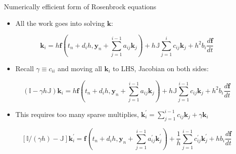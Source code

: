 \documentclass[serif]{beamer}
\begin{document}
\begin{frame}{Numerically efficient form of Rosenbrock equations}
  \begin{itemize}
    \item All the work goes into solving $\mathbf{k}$:
  \end{itemize}
  \begin{equation}
    \nonumber 
    \mathbf{k}_{i} = h\mathbf{f} \left(t_n + d_ih,\mathbf{y}_n + \sum_{j=1}^{i-1}a_{ij}\mathbf{k}_{j}\right) 
                   + h\mathbb{J}\sum_{j=1}^i c_{ij}\mathbf{k}_{j}  + h^2b_i\frac{d\mathbf{f}}{dt}
  \end{equation}
  \begin{itemize}
    \item Recall $\gamma\equiv c_{ii}$ and moving all $\mathbf{k}_i$ to LHS, \alert{Jacobian on both sides}:
  \end{itemize}
    \begin{equation}
    \nonumber 
    \left(\mathbb{I} - \gamma h \mathbb{J}\right)\mathbf{k}_{i} = h\mathbf{f} \left(t_n + d_ih,\mathbf{y}_n + \sum_{j=1}^{i-1}a_{ij}\mathbf{k}_{j}\right) 
                   + h\mathbb{J}\sum_{j=1}^{i-1} c_{ij}\mathbf{k}_{j}  + h^2b_i\frac{d\mathbf{f}}{dt}
  \end{equation}
  \begin{itemize}
    \item This requires too many sparse multiplies, $\mathbf{k}^\prime_i=\sum_{j=1}^{i-1}c_{ij}\mathbf{k}_j + \gamma\mathbf{k}_i$
  \end{itemize}
  \begin{equation}
    \nonumber 
    \left[\mathbb{I}/\left(\gamma h\right) - \mathbb{J}\right]\mathbf{k}^\prime_{i} = \mathbf{f} \left(t_n + d_ih,\mathbf{y}_n + \sum_{j=1}^{i-1}a^\prime_{ij}\mathbf{k}^\prime_{j}\right) 
                   + \frac{1}{h}\sum_{j=1}^{i-1} c^\prime_{ij}\mathbf{k}^\prime_{j}  + hb_i\frac{d\mathbf{f}}{dt}
  \end{equation}
\end{frame}
\end{document}
